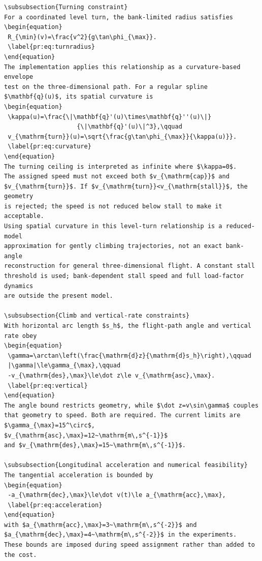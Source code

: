 \documentclass[12pt]{article}
\begin{document}
\begin{verbatim}
\subsubsection{Turning constraint}
For a coordinated level turn, the bank-limited radius satisfies
\begin{equation}
 R_{\min}(v)=\frac{v^2}{g\tan\phi_{\max}}.
 \label{pr:eq:turnradius}
\end{equation}
The implementation applies this relationship as a curvature-based envelope
test on the three-dimensional path. For a regular spline
$\mathbf{q}(u)$, its spatial curvature is
\begin{equation}
 \kappa(u)=\frac{\|\mathbf{q}'(u)\times\mathbf{q}''(u)\|}
                    {\|\mathbf{q}'(u)\|^3},\qquad
 v_{\mathrm{turn}}(u)=\sqrt{\frac{g\tan\phi_{\max}}{\kappa(u)}}.
 \label{pr:eq:curvature}
\end{equation}
The turning ceiling is interpreted as infinite where $\kappa=0$.
The assigned speed must not exceed both $v_{\mathrm{cap}}$ and
$v_{\mathrm{turn}}$. If $v_{\mathrm{turn}}<v_{\mathrm{stall}}$, the geometry
is rejected; the speed is not reduced below stall to make it acceptable.
Using spatial curvature in this level-turn relationship is a reduced-model
approximation for gently climbing trajectories, not an exact bank-angle
reconstruction for general three-dimensional flight. A constant stall
threshold is used; bank-dependent stall speed and full load-factor dynamics
are outside the present model.

\subsubsection{Climb and vertical-rate constraints}
With horizontal arc length $s_h$, the flight-path angle and vertical rate obey
\begin{equation}
 \gamma=\arctan\left(\frac{\mathrm{d}z}{\mathrm{d}s_h}\right),\qquad
 |\gamma|\le\gamma_{\max},\qquad
 -v_{\mathrm{des},\max}\le\dot z\le v_{\mathrm{asc},\max}.
 \label{pr:eq:vertical}
\end{equation}
The angle bound restricts geometry, while $\dot z=v\sin\gamma$ couples
that geometry to speed. Both are required. The current limits are
$\gamma_{\max}=15^\circ$, $v_{\mathrm{asc},\max}=12~\mathrm{m\,s^{-1}}$
and $v_{\mathrm{des},\max}=15~\mathrm{m\,s^{-1}}$.

\subsubsection{Longitudinal acceleration and numerical feasibility}
The tangential acceleration is bounded by
\begin{equation}
 -a_{\mathrm{dec},\max}\le\dot v(t)\le a_{\mathrm{acc},\max},
 \label{pr:eq:acceleration}
\end{equation}
with $a_{\mathrm{acc},\max}=3~\mathrm{m\,s^{-2}}$ and
$a_{\mathrm{dec},\max}=4~\mathrm{m\,s^{-2}}$ in the experiments.
These bounds are imposed during speed assignment rather than added to the cost.


\end{verbatim}
\end{document}
